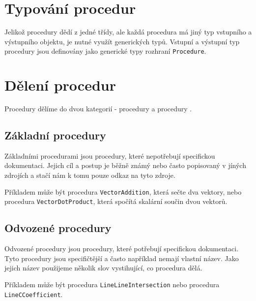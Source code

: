\section[Typování]{Typování procedur}
\label{sec:procedure-typing}

Jelikož procedury dědí z jedné třídy, ale každá procedura má jiný typ vstupního a výstupního objektu, je nutné využít generických typů\cite{TypeScript:generics}.
Vstupní a výstupní typ procedury jsou definovány jako generické typy rozhraní \texttt{Procedure}\cite[line 6]{geometryjs:source:interfaces:procedure.ts}.

\section[Dělení]{Dělení procedur}
\label{subsec:procedure-categorization}

Procedury dělíme do dvou kategorií - procedury  a procedury \cite{geometryjs:wiki:procedures}.

\subsection[Základní]{Základní procedury}
\label{subsubsec:basic-procedures}

Základními procedurami jsou procedury, které nepotřebují specifickou dokumentaci.
Jejich cíl a postup je běžně známý nebo často popisovaný v jíných zdrojích a stačí nám k tomu pouze odkaz na tyto zdroje.

Příkladem může být procedura \texttt{VectorAddition}\cite[line 9-23]{geometryjs:source:procedures:vectorOperations.ts}, která sečte dva vektory, nebo procedura \texttt{VectorDotProduct}\cite[line 88-99]{geometryjs:source:procedures:vectorOperations.ts}, která spočítá skalární součin dvou vektorů.

\subsection[Odvozené]{Odvozené procedury}
\label{subsubsec:derived-procedures}

Odvozené procedury jsou procedury, které potřebují specifickou dokumentaci\cite{geometryjs:wiki:procedures}.
Tyto procedury jsou specifičtější a často například nemají vlastní název.
Jako jejich název použijeme několik slov vystihující, co procedura dělá.

Příkladem může být procedura \texttt{LineLineIntersection}\cite[line 11-27]{geometryjs:source:procedures:lineLine.ts} nebo procedura \texttt{LineCCoefficient}\cite[line 11-20]{geometryjs:source:procedures:lineEquation.ts}.
